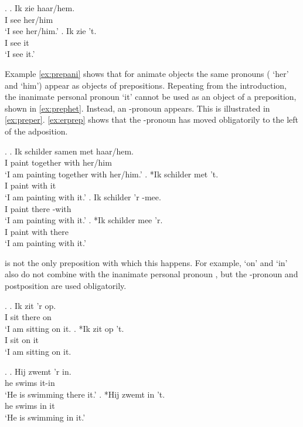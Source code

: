 \documentclass[12pt]{article}
\begin{document}
 \ex. \label{ex:objverb}
 \ag. Ik zie haar/hem.\\
  I see her/him\\
  `I see her/him.'\label{ex:aniobj}
 \bg. Ik zie 't.\\
  I see it\\
  `I see it.'\label{ex:inaniobj}

Example \ref{ex:prepani} shows that for animate objects the same pronouns ( `her' and  `him') appear as objects of prepositions. Repeating from the introduction, the inanimate personal pronoun  `it' cannot be used as an object of a preposition, shown in \ref{ex:prephet}. Instead, an -pronoun appears. This is illustrated in \ref{ex:preper}. \ref{ex:erprep} shows that the -pronoun has moved obligatorily to the left of the adposition.

\ex. \label{ex:objprep}
\ag. Ik schilder samen met haar/hem.\\
 I paint together with her/him\\
 `I am painting together with her/him.'\label{ex:prepani}
\bg. *Ik schilder met 't.\\
 I paint with it\\
 `I am painting with it.'\label{ex:prephet}
\bg. Ik schilder 'r -mee.\\
 I paint there -with\\
 `I am painting with it.'\label{ex:preper}
\bg. *Ik schilder mee 'r.\\
 I paint with there\\
 `I am painting with it.'\label{ex:erprep}

 is not the only preposition with which this happens. For example,  `on' and  `in' also do not combine with the inanimate personal pronoun , but the -pronoun and postposition are used obligatorily.

\ex.
\ag. Ik zit 'r op.\\
 I sit there on\\
 `I am sitting on it.
\bg. *Ik zit op 't.\\
 I sit on it\\
 `I am sitting on it.

\ex.
 \ag. Hij zwemt 'r in.\\
  he swims it-in\\
  `He is swimming there it.'
 \bg. *Hij zwemt in 't.\\
  he swims in it\\
  `He is swimming in it.'
\end{document}
